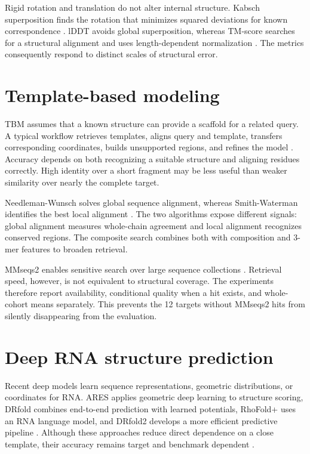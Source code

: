 \documentclass[12pt,a4paper,oneside]{report}
\begin{document}
Rigid rotation and translation do not alter internal structure. Kabsch superposition
finds the rotation that minimizes squared deviations for known correspondence
\cite{kabsch}. lDDT avoids global superposition, whereas TM-score searches for a
structural alignment and uses length-dependent normalization
\cite{tm_score,lddt,usalign}. The metrics consequently respond to distinct scales of
structural error.

\section{Template-based modeling}

TBM assumes that a known structure can provide a scaffold for a related query. A typical
workflow retrieves templates, aligns query and template, transfers corresponding
coordinates, builds unsupported regions, and refines the model
\cite{rna_progress_review,competition_paper}. Accuracy depends on both recognizing a
suitable structure and aligning residues correctly. High identity over a short fragment
may be less useful than weaker similarity over nearly the complete target.

Needleman-Wunsch solves global sequence alignment, whereas Smith-Waterman identifies the
best local alignment \cite{needleman_wunsch,smith_waterman}. The two algorithms expose
different signals: global alignment measures whole-chain agreement and local alignment
recognizes conserved regions. The composite search combines both with composition and
3-mer features to broaden retrieval.

MMseqs2 enables sensitive search over large sequence collections
\cite{mmseqs2}. Retrieval speed, however, is not equivalent to structural coverage. The
experiments therefore report availability, conditional quality when a hit exists, and
whole-cohort means separately. This prevents the 12 targets without MMseqs2 hits from
silently disappearing from the evaluation.

\section{Deep RNA structure prediction}

Recent deep models learn sequence representations, geometric distributions, or
coordinates for RNA. ARES applies geometric deep learning to structure scoring, DRfold
combines end-to-end prediction with learned potentials, RhoFold+ uses an RNA language
model, and DRfold2 develops a more efficient predictive pipeline
\cite{ares,drfold,rhofoldplus,drfold2}. Although these approaches reduce direct
dependence on a close template, their accuracy remains target and benchmark dependent
\cite{state_of_rnart,drfold2}.
\end{document}
